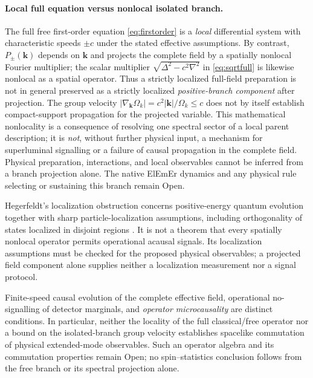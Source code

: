 \documentclass[11pt]{article}
\theoremstyle{definition}
\newcommand{\ElEmEr}{\mbox{ElEmEr}}
\begin{document}
\paragraph{Local full equation versus nonlocal isolated branch.}
The full free first-order equation \eqref{eq:firstorder} is a \emph{local} differential
system with characteristic speeds $\pm c$ under the stated effective assumptions.
By contrast, $P_\pm(\mathbf k)$ depends on $\mathbf k$ and projects the complete field
by a spatially nonlocal Fourier multiplier; the scalar multiplier
$\sqrt{\Delta^2-c^2\nabla^2}$ in \eqref{eq:sqrtfull} is likewise nonlocal as a
spatial operator.  Thus a strictly localized full-field preparation is not in
general preserved as a strictly localized \emph{positive-branch component} after
projection.  The group velocity
$|\nabla_{\mathbf k}\Omega_k|=c^2|\mathbf k|/\Omega_k\leq c$ does
not by itself establish compact-support propagation for the projected variable.
This mathematical nonlocality is a consequence of resolving one spectral sector
of a local parent description; it is \emph{not}, without further physical input,
a mechanism for superluminal signalling or a failure of causal propagation in the
complete field.  Physical preparation, interactions, and local observables cannot
be inferred from a branch projection alone.  The native \ElEmEr{} dynamics and any
physical rule selecting or sustaining this branch remain Open.

Hegerfeldt's localization obstruction concerns positive-energy quantum
evolution together with sharp particle-localization assumptions, including
orthogonality of states localized in disjoint regions
\cite{Hegerfeldt1974}. It is not a theorem that every spatially nonlocal
operator permits operational acausal signals. Its localization assumptions
must be checked for the proposed physical observables; a projected field
component alone supplies neither a localization measurement nor a signal protocol.

Finite-speed causal evolution of the complete effective field, operational
no-signalling of detector marginals, and \emph{operator microcausality} are distinct
conditions.  In particular, neither the locality of the full classical/free
operator nor a bound on the isolated-branch group velocity establishes spacelike
commutation of physical extended-mode observables.  Such an operator algebra and
its commutation properties remain Open; no spin--statistics conclusion follows
from the free branch or its spectral projection alone.
\end{document}
